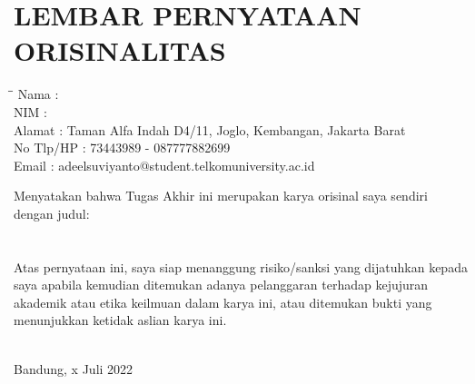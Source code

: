 \chapter*{LEMBAR PERNYATAAN ORISINALITAS}
\bigskip

\begin{tabbing}
	\hspace{30mm}\=\hspace{5mm}\=\kill
	Nama \> : \> \penulis \\
	NIM \> : \> \nim \\
	Alamat \> : \> Taman Alfa Indah D4/11, Joglo, Kembangan, Jakarta Barat \\
	No Tlp/HP \> :  73443989 - 087777882699 \\
	Email \> : \> adeelsuviyanto@student.telkomuniversity.ac.id \\
\end{tabbing}
\bigskip

\noindent Menyatakan bahwa Tugas Akhir ini merupakan karya orisinal saya sendiri dengan judul:
\bigskip\\
\textbf{\judul} \\
\textbf{\textit{\juduleng}}
\bigskip\\
Atas pernyataan ini, saya siap menanggung risiko/sanksi yang dijatuhkan kepada saya apabila kemudian ditemukan adanya pelanggaran terhadap kejujuran akademik atau etika keilmuan dalam karya ini, atau ditemukan bukti yang menunjukkan ketidak aslian karya ini.\\
\bigskip\\

\begin{flushright}
	Bandung, x Juli 2022\\
	\vspace{15mm}
	\penulis\\
	\nim
\end{flushright}
